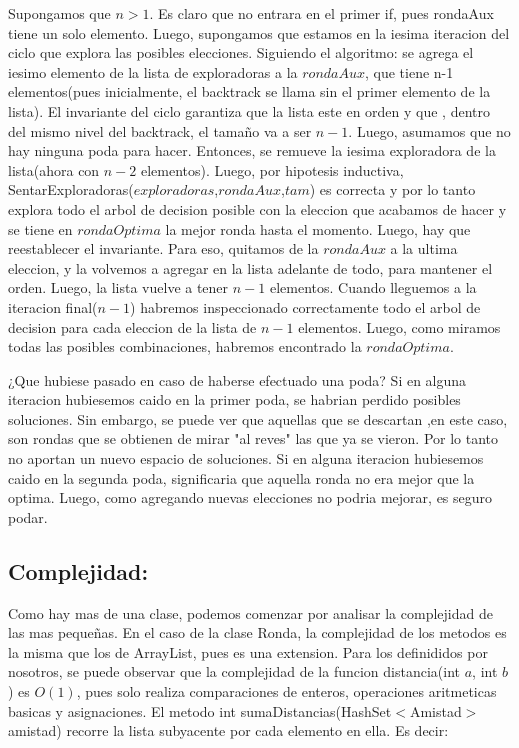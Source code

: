 \documentclass[10pt, a4paper]{article}
\begin{document}
Supongamos que $n> 1$.  Es claro que no entrara en el primer if, pues rondaAux tiene un solo elemento. Luego, supongamos que estamos en la iesima iteracion del ciclo que explora las posibles elecciones. Siguiendo el algoritmo: se agrega el iesimo elemento de la lista de exploradoras a la $rondaAux$, que tiene n-1 elementos(pues inicialmente, el backtrack se llama  sin el primer elemento de la lista). El invariante del ciclo garantiza que la lista este en orden y que , dentro del mismo nivel del backtrack, el tamaño va a ser $n-1$. Luego, asumamos que no hay ninguna poda para hacer. Entonces, se remueve la iesima exploradora de la lista(ahora con $n-2$ elementos). Luego, por hipotesis inductiva, SentarExploradoras($exploradoras$,$rondaAux$,$tam$) es correcta y por lo tanto explora todo el arbol de decision posible con la eleccion que acabamos de hacer y se tiene en $rondaOptima$ la mejor ronda hasta el momento. Luego, hay que reestablecer el invariante. Para eso, quitamos de la $rondaAux$ a la ultima eleccion, y la volvemos a agregar en la lista adelante de todo, para mantener el orden. Luego, la lista vuelve a tener $n-1$ elementos. Cuando lleguemos a la iteracion final($n-1$) habremos inspeccionado correctamente todo el arbol de decision para cada eleccion de la lista de $n-1$ elementos. Luego, como miramos todas las posibles combinaciones, habremos encontrado la $rondaOptima$.

¿Que hubiese pasado en caso de haberse efectuado una poda?
Si en alguna iteracion hubiesemos caido en la primer poda, se habrian perdido posibles soluciones. Sin embargo, se puede ver que aquellas que se descartan ,en este caso, son rondas que se obtienen de mirar "al reves" las que ya se vieron. Por lo tanto no aportan un nuevo espacio de soluciones.
Si en alguna iteracion hubiesemos caido en la segunda poda, significaria que aquella ronda no era mejor que la optima. Luego, como agregando nuevas elecciones no podria mejorar, es seguro podar.

\subsection{Complejidad:}

Como hay mas de una clase, podemos comenzar por analisar la complejidad de las mas pequeñas.
En el caso de la clase Ronda, la complejidad de los metodos es la misma que los de ArrayList, pues es una extension. 
Para los definididos por nosotros, se puede observar que la complejidad de la funcion distancia(int $a$, int $b$) es $O(1)$, pues solo realiza comparaciones de enteros, operaciones aritmeticas basicas y asignaciones.
El metodo  int  sumaDistancias(HashSet$<$Amistad$>$ amistad) recorre la lista subyacente por cada elemento en ella. Es decir:
\end{document}
